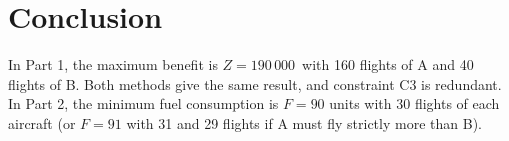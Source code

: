 \documentclass{ieeeaccess}
\begin{document}
\section{Conclusion}
In Part 1, the maximum benefit is $Z = 190\,000$\,\texteuro{} with 160 flights
of A and 40 flights of B. Both methods give the same result, and constraint C3
is redundant. In Part 2, the minimum fuel consumption is $F = 90$ units with
30 flights of each aircraft (or $F = 91$ with 31 and 29 flights if A must fly
strictly more than B).

\EOD
\end{document}
